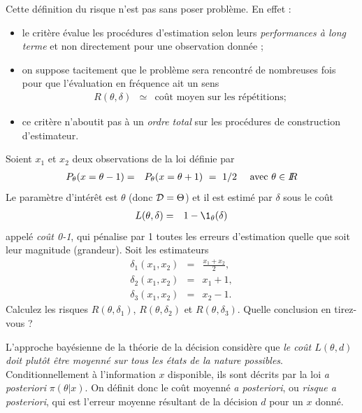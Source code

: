 
\noindent Cette définition du risque n'est pas sans poser problème. En effet :
\begin{itemize}
\item le critère évalue les procédures d'estimation selon leurs  \emph{performances à long terme} et non directement pour une observation donnée ;
\item on suppose tacitement que le problème sera rencontré de nombreuses fois pour que l'évaluation en fréquence ait un sens
\begin{eqnarray*}
R(\theta,\delta) & \simeq & \text{co\^ut moyen sur les répétitions} ;
\end{eqnarray*}
\item ce critère n'aboutit pas à un  \emph{ordre total} sur les procédures de construction d'estimateur. \\
\end{itemize}

\begin{exec}\label{exo6}
Soient $x_1 $ et $x_2$ deux observations de la loi définie par \begin{eqnarray*}
P_{\theta}(x=\theta-1) & = & P_{\theta}(x=\theta+1) \ = \ 1/2 \ \ \ \ \text{avec $\theta\in\R$}
\end{eqnarray*}
Le paramètre d'intér\^et est $\theta$ (donc ${\cal{D}}=\Theta$) et il est estimé par $\delta$ sous le co\^ut
\begin{eqnarray*}
L(\theta,\delta) & = & 1 - \1_{\theta}(\delta)
\end{eqnarray*}
appelé  \emph{co\^ut 0-1}, qui pénalise par 1 toutes les erreurs d'estimation quelle que soit leur magnitude (grandeur). Soit les estimateurs
\begin{eqnarray*}
\delta_1(x_1,x_2) & = & \frac{x_1+x_2}{2}, \\
\delta_2(x_1,x_2) & = & x_1 + 1, \\
\delta_3(x_1,x_2) & = & x_2 - 1. 
\end{eqnarray*}
Calculez les risques $R(\theta,\delta_1)$, $R(\theta,\delta_2)$ et $R(\theta,\delta_3)$. Quelle conclusion en tirez-vous ? 
\end{exec}
\if{} 
\fi

\vspace{1cm}

L'approche bayésienne de la théorie de la décision considère que  \emph{le co\^ut $L(\theta,d)$ doit plut\^ot \^etre moyenné sur tous les états de la nature possibles}. Conditionnellement à l'information $x$ disponible, ils sont décrits par la loi {\it a posteriori} $\pi(\theta|x)$. On définit donc le  { { co\^ut moyenné {\it a posteriori}}}, ou \emph{risque a posteriori}, qui est l'erreur moyenne résultant de la décision $d$ pour un $x$ donné. 

